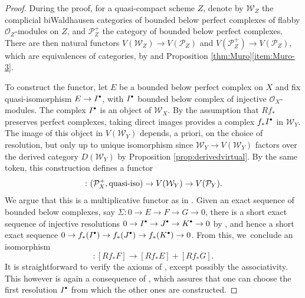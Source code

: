 \documentclass[11pt]{article}
\newcommand{\sbullet}{{\scriptscriptstyle\bullet}}
\newcommand{\csbullet}{{\raisebox{1pt}{$\sbullet$}}}
\theoremstyle{plain}
\theoremstyle{definition}
\newcommand{\Ocal}{\mathcal O}
\newcommand{\Pcal}{\mathcal P}
\newcommand{\Wcal}{\mathcal W}
\begin{document}
\begin{proof}
During the proof, for a quasi-compact scheme $Z$, denote by $\Wcal_{Z}$ the complicial biWaldhausen categories of bounded below perfect complexes of flabby $\Ocal_{Z}$\nobreakdash-mod\-ules on $Z$, and $\Pcal^+_Z$ the category of bounded below perfect complexes. There are then natural functors $V(\Wcal_{Z}) \to V(\Pcal_Z)$ and $V(\Pcal^+_Z) \to V(\Pcal_Z)$, which are equivalences of categories, by \cite[Lem.\,3.5]{ThomasonTrobaugh} and Proposition \ref{thm:Muro}\eqref{item:Muro-3}.

To construct the functor, let $E$ be a bounded below perfect complex on $X$ and fix quasi-isomorphism $E\to I^{\csbullet}$, with $I^{\csbullet}$ bounded below complex of injective $\Ocal_X$\nobreakdash-mod\-ules. The complex $I^{\csbullet}$ is an object of $\Wcal_{X}$. By the assumption that $Rf_{\ast}$ preserves perfect complexes, taking direct images provides a complex $f_\ast I^{\csbullet}$ in $\Wcal_Y$. The image of this object in $V(\Wcal_Y)$ depends, a priori, on the choice of resolution, but only up to unique isomorphism since $\Wcal_{Y}\to V(\Wcal_{Y})$ factors over the derived category $D(\Wcal_Y)$ by Proposition \ref{prop:derivedvirtual}. By the same token, this construction defines a functor
\begin{displaymath}
[Rf_{\ast}(\cdot)]\colon (\Pcal^+_{X},\hbox{quasi-iso})\to V(\Wcal_Y) \to V(\Pcal_Y).
\end{displaymath}
We argue that this is a multiplicative functor as in \cite[Def.\,1.2.3]{Muro:determinant}. Given an exact sequence of bounded below complexes, say $\Sigma: 0 \to E \to F \to G \to 0$, there is a short exact sequence of injective resolutions $0 \to I^{\csbullet} \to J^{\csbullet} \to K^{\csbullet} \to 0$ by \cite[\href{https://stacks.math.columbia.edu/tag/013T}{013T}]{stacks-project}, and hence a short exact sequence $0 \to f_\ast (I^{\csbullet}) \to f_\ast (J^{\csbullet}) \to f_\ast (K^{\csbullet}) \to 0$. From this, we~conclude an isomorphism
\begin{displaymath}
[\Sigma]: [Rf_\ast F] \to [Rf_\ast E] + [Rf_\ast G].
\end{displaymath}
It is straightforward to verify the axioms of \cite[Def.\,1.2.3]{Muro:determinant}, except possibly the associativity. This however is again a consequence of \cite[\href{https://stacks.math.columbia.edu/tag/013T}{013T}]{stacks-project}, which assures that one can choose the first resolution $I^{\csbullet}$ from which the other ones are constructed.


\end{proof}
\end{document}
